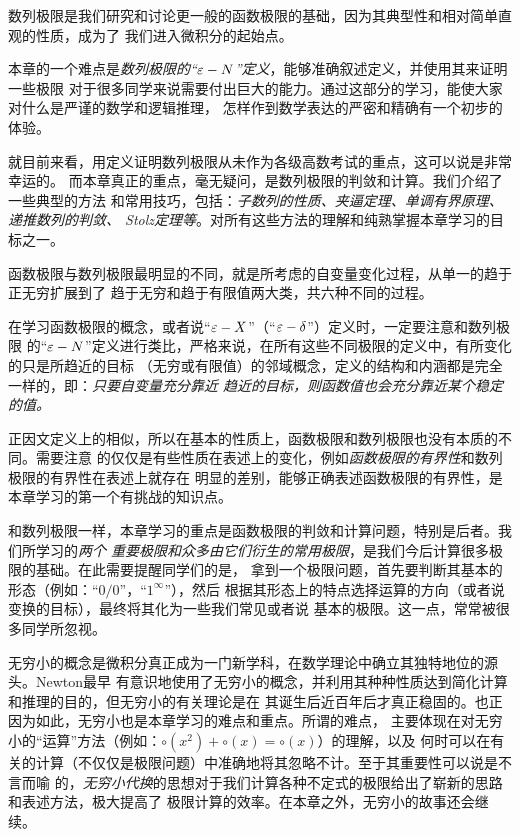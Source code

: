 数列极限是我们研究和讨论更一般的函数极限的基础，因为其典型性和相对简单直观的性质，成为了
我们进入微积分的起始点。

本章的一个难点是{\it 数列极限的“$\varepsilon-N$”定义}，能够准确叙述定义，并使用其来证明一些极限
对于很多同学来说需要付出巨大的能力。通过这部分的学习，能使大家对什么是严谨的数学和逻辑推理，
怎样作到数学表达的严密和精确有一个初步的体验。

就目前来看，用定义证明数列极限从未作为各级高数考试的重点，这可以说是非常幸运的。
而本章真正的重点，毫无疑问，是数列极限的判敛和计算。我们介绍了一些典型的方法
和常用技巧，包括：{\it 子数列的性质、夹逼定理、单调有界原理、递推数列的判敛、
Stolz定理等}。对所有这些方法的理解和纯熟掌握本章学习的目标之一。

函数极限与数列极限最明显的不同，就是所考虑的自变量变化过程，从单一的趋于正无穷扩展到了
趋于无穷和趋于有限值两大类，共六种不同的过程。

在学习函数极限的概念，或者说“$\varepsilon-X$”（“$\varepsilon-\delta$”）定义时，一定要注意和数列极限
的“$\varepsilon-N$”定义进行类比，严格来说，在所有这些不同极限的定义中，有所变化的只是所趋近的目标
（无穷或有限值）的邻域概念，定义的结构和内涵都是完全一样的，即：{\it 只要自变量充分靠近
趋近的目标，则函数值也会充分靠近某个稳定的值。}

正因文定义上的相似，所以在基本的性质上，函数极限和数列极限也没有本质的不同。需要注意
的仅仅是有些性质在表述上的变化，例如{\it 函数极限的有界性}和数列极限的有界性在表述上就存在
明显的差别，能够正确表述函数极限的有界性，是本章学习的第一个有挑战的知识点。

和数列极限一样，本章学习的重点是函数极限的判敛和计算问题，特别是后者。我们所学习的{\it 两个
重要极限和众多由它们衍生的常用极限}，是我们今后计算很多极限的基础。在此需要提醒同学们的是，
拿到一个极限问题，首先要判断其基本的形态（例如：“$0/0$”，“$1^{\infty}$”），然后
根据其形态上的特点选择运算的方向（或者说变换的目标），最终将其化为一些我们常见或者说
基本的极限。这一点，常常被很多同学所忽视。

无穷小的概念是微积分真正成为一门新学科，在数学理论中确立其独特地位的源头。Newton最早
有意识地使用了无穷小的概念，并利用其种种性质达到简化计算和推理的目的，但无穷小的有关理论是在
其诞生后近百年后才真正稳固的。也正因为如此，无穷小也是本章学习的难点和重点。所谓的难点，
主要体现在对无穷小的“运算”方法（例如：$\circ(x^2)+\circ(x)=\circ(x)$）的理解，以及
何时可以在有关的计算（不仅仅是极限问题）中准确地将其忽略不计。至于其重要性可以说是不言而喻
的，{\it 无穷小代换}的思想对于我们计算各种不定式的极限给出了崭新的思路和表述方法，极大提高了
极限计算的效率。在本章之外，无穷小的故事还会继续。

